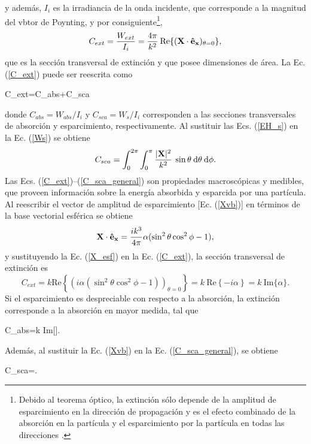 y además, $I_i$ es la irradiancia de la onda incidente, que corresponde a la magnitud del vbtor de Poynting, y por consiguiente\footnote{Debido al teorema óptico, la extinción sólo depende de la amplitud de esparcimiento en la dirección de propagación y es el efecto combinado de la absorción en la partícula y el esparcimiento por la partícula en todas las direcciones \cite{bohrenAbsorptionScatteringLight2008}.},
%
\begin{equation}
	C_{ext}=\frac{W_{ext}}{I_i}=\frac{4\pi}{k^2}\:\text{Re}\{(\vb{X}\cdot\vb{\hat{e}_x})_{\theta=0}\}, \label{C_ext}
\end{equation}
%
que es la sección transversal de extinción y que posee dimensiones de área. La Ec. (\ref{C_ext}) puede ser reescrita como \cite{bohrenAbsorptionScatteringLight2008}
%
\begin{tcolorbox}
	C_{ext}=C_{abs}+C_{sca}
	\label{C}
\end{tcolorbox}
%
donde $C_{abs}=W_{abs}/I_i$ y $C_{sca}=W_s/I_i$ corresponden a las secciones transversales de absorción y esparcimiento, respectivamente. Al sustituir las Ecs. (\ref{EH_s}) en la Ec. (\ref{Ws}) se obtiene
%
\begin{equation}
	C_{sca}=\int_0^{2\pi}\int_0^{\pi}\frac{|\vb{X}|^2}{k^2}\:\sin\theta\: \text{d}\theta\:\text{d}\phi.
	\label{C_sca_general}
\end{equation}
Las Ecs. (\ref{C_ext})--(\ref{C_sca_general}) son propiedades macroscópicas y medibles, que proveen información sobre la energía absorbida y esparcida por una partícula.  \\

Al reescribir el vector de amplitud de esparcimiento [Ec. (\ref{Xvb})] en términos de la base vectorial esférica se obtiene \cite{bohrenAbsorptionScatteringLight2008}
%
\begin{equation}
	\vb{X}\cdot\vb{\hat{e}_x}=\frac{ik^3}{4\pi}\alpha(\sin^2\theta\cos^2\phi-1),  
	\label{X_esf}
\end{equation}
%
y sustituyendo la Ec. (\ref{X_esf}) en la Ec. (\ref{C_ext}), la sección transversal de extinción es
%
\begin{equation*}
	C_{ext}=k \mbox{Re}\left\{\left(i\alpha(\sin^2\theta\cos^2\phi-1)\right)_{\theta=0}\right\}=k\:\mbox{Re}\left\{-i\alpha\right\}=k\: \mbox{Im}\{\alpha\}.
\end{equation*}
%
Si el esparcimiento es despreciable con respecto a la absorción, la extinción corresponde a la absorción en mayor medida, tal que \cite{bohrenAbsorptionScatteringLight2008}
%
\begin{tcolorbox}
	C_{abs}=k\: \mbox{Im}[\alpha].    
\end{tcolorbox}
Además, al sustituir la Ec. (\ref{Xvb}) en la Ec. (\ref{C_sca_general}), se obtiene \cite{bohrenAbsorptionScatteringLight2008}
%
\begin{tcolorbox}
	C_{sca}=.    
\end{tcolorbox}
